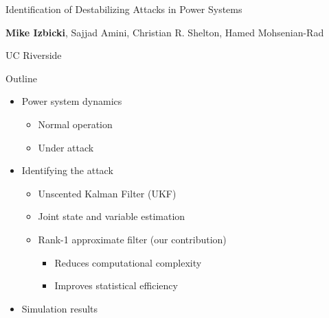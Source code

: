\documentclass{beamer}
\author {Mike Izbicki}
\institute{UC Riverside}
\title[Identifying Attacks in Power Systems]{}
\begin{document}
\beamertemplatenavigationsymbolsempty


\begin{frame}
\begin{center}
\Huge
Identification of Destabilizing Attacks 
in Power Systems
\end{center}

\vspace{0.5in}
\begin{center}
\textbf{Mike Izbicki}, Sajjad Amini, Christian R. Shelton, Hamed Mohsenian-Rad

UC Riverside
\end{center}
\end{frame}





\begin{frame}{Outline}
\Large
\begin{itemize}
\item Power system dynamics
\begin{itemize}
\Large
\item Normal operation
\item Under attack
\end{itemize}

\vspace{0.15in}
\item Identifying the attack 
\begin{itemize}
\Large
\item Unscented Kalman Filter (UKF)
\item Joint state and variable estimation

\vspace{0.075in}
\item Rank-1 approximate filter (our contribution)
\begin{itemize}
\Large
\item Reduces computational complexity
\item Improves statistical efficiency
\end{itemize}
\end{itemize}

\vspace{0.15in}
\item Simulation results
\end{itemize}
\end{frame}
\end{document}
